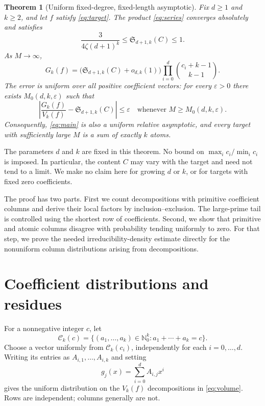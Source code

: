\documentclass[11pt]{amsart}
\newcommand{\Nzero}{\mathbb N_0}
\newcommand{\Sseries}{\mathfrak S}
\newtheorem{theorem}{Theorem}[section]
\theoremstyle{definition}
\theoremstyle{remark}
\begin{document}
\begin{theorem}[Uniform fixed-degree, fixed-length asymptotic]
\label{thm:main}
Fix $d\ge1$ and $k\ge2$, and let $f$ satisfy \eqref{eq:target}.
The product \eqref{eq:series} converges absolutely and satisfies
\begin{equation}\label{eq:positive}
\frac{3}{4\zeta(d+1)^k}\le\Sseries_{d+1,k}(C)\le1.
\end{equation}
As $M\to\infty$,
\begin{equation}\label{eq:main}
G_k(f)=
\bigl(\Sseries_{d+1,k}(C)+o_{d,k}(1)\bigr)
\prod_{i=0}^d\binom{c_i+k-1}{k-1}.
\end{equation}
The error is uniform over all positive coefficient vectors: for every
$\varepsilon>0$ there exists $M_0(d,k,\varepsilon)$ such that
\[
\left|\frac{G_k(f)}{V_k(f)}-\Sseries_{d+1,k}(C)\right|
\le\varepsilon
\quad\text{whenever }M\ge M_0(d,k,\varepsilon).
\]
Consequently, \eqref{eq:main} is also a uniform relative asymptotic,
and every target with sufficiently large $M$ is a sum of exactly $k$
atoms.
\end{theorem}

The parameters $d$ and $k$ are fixed in this theorem. No bound on
$\max_i c_i/\min_i c_i$ is imposed. In particular, the content $C$
may vary with the target and need not tend to a limit. We make no
claim here for growing $d$ or $k$, or for targets with fixed zero
coefficients.

The proof has two parts. First we count decompositions with primitive
coefficient columns and derive their local factors by
inclusion--exclusion. The large-prime tail is controlled using the
shortest row of coefficients. Second, we show that primitive and atomic
columns disagree with probability tending uniformly to zero. For that
step, we prove the needed irreducibility-density estimate directly for
the nonuniform column distributions arising from decompositions.

\section{Coefficient distributions and residues}\label{sec:residues}

For a nonnegative integer $c$, let
\[
\mathcal C_k(c)=\{(a_1,\ldots,a_k)\in\Nzero^k:a_1+\cdots+a_k=c\}.
\]
Choose a vector uniformly from $\mathcal C_k(c_i)$, independently for
each $i=0,\ldots,d$. Writing its entries as $A_{i,1},\ldots,A_{i,k}$
and setting
\[
g_j(x)=\sum_{i=0}^d A_{i,j}x^i
\]
gives the uniform distribution on the $V_k(f)$ decompositions in
\eqref{eq:volume}. Rows are independent; columns generally are not.
\end{document}
